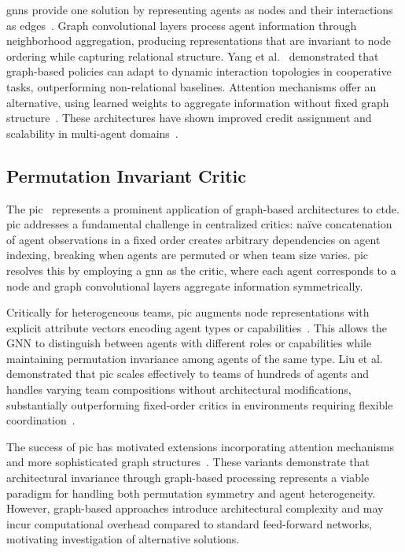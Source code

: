 \Glspl{gnn} provide one solution by representing agents as nodes and their 
interactions as edges~\cite{yang2021a}. Graph convolutional layers process agent 
information through neighborhood aggregation, producing representations that are 
invariant to node ordering while capturing relational structure. 
Yang et al.~\cite{yang2021a} demonstrated that graph-based policies can adapt to 
dynamic interaction topologies in cooperative tasks, outperforming non-relational baselines. 
Attention mechanisms offer an alternative, using learned weights to aggregate 
information without fixed graph structure~\cite{zambaldi2018, tang2021}. 
These architectures have shown improved credit assignment and scalability in 
multi-agent domains~\cite{hao2023}.

\subsection{Permutation Invariant Critic}

The \gls{pic}~\cite{liu2020b} represents a 
prominent application of graph-based architectures to \gls{ctde}. 
\Gls{pic} addresses a fundamental challenge in centralized critics: na\"ive 
concatenation of agent observations in a fixed order creates arbitrary 
dependencies on agent indexing, breaking when agents are permuted or 
when team size varies. \Gls{pic} resolves this by employing a \gls{gnn} as the critic, 
where each agent corresponds to a node and graph 
convolutional layers aggregate information symmetrically.

Critically for heterogeneous teams, \gls{pic} augments node representations 
with explicit attribute vectors encoding agent types or capabilities~\cite{liu2020b}. 
This allows the GNN to distinguish between agents with different roles or capabilities 
while maintaining permutation invariance among agents of the same type. 
Liu et al. demonstrated that \gls{pic} scales effectively to teams of hundreds of 
agents and handles varying team compositions without architectural modifications, 
substantially outperforming fixed-order critics in environments 
requiring flexible coordination~\cite{liu2020b}.

The success of \gls{pic} has motivated extensions incorporating attention 
mechanisms and more sophisticated graph structures~\cite{hao2023, hao2022}. 
These variants demonstrate that architectural invariance through graph-based processing 
represents a viable paradigm for handling both permutation symmetry and agent heterogeneity. 
However, graph-based approaches introduce architectural complexity and may incur 
computational overhead compared to standard feed-forward networks, 
motivating investigation of alternative solutions.

